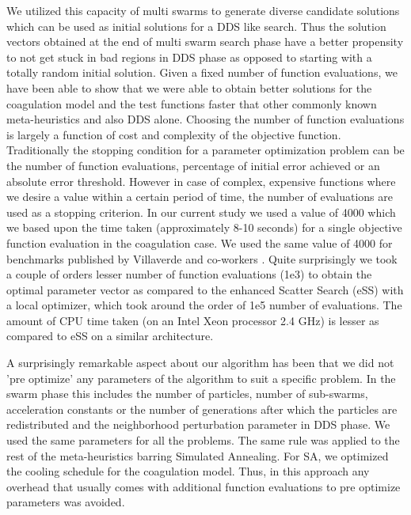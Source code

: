 \documentclass[12pt]{article}
\begin{document}
We utilized this capacity of multi swarms to generate diverse candidate solutions which can be used as initial solutions for a DDS like search. Thus the solution vectors obtained at the end of multi swarm search phase have a better propensity to not get stuck in bad regions in DDS phase as opposed to starting with a totally random initial solution. Given a fixed number of function evaluations, we have been able to show that we were able to obtain better solutions for the coagulation model and the test functions faster that other commonly known meta-heuristics and also DDS alone.  Choosing the number of function evaluations is largely a function of cost and complexity of the objective function. Traditionally the stopping condition for a parameter optimization problem can be the number of function evaluations, percentage of initial error achieved or an absolute error threshold. However in case of complex, expensive functions where we desire a value within a certain period of time, the number of evaluations are used as a stopping criterion. In our current study we used a value of 4000 which we based upon the time taken (approximately 8-10 seconds) for a single objective function evaluation in the coagulation case. We used the same value of 4000 for benchmarks published by Villaverde and co-workers \cite{villaverde2015biopredyn}. Quite surprisingly we took a couple of orders lesser number of function evaluations (1e3) to obtain the optimal parameter vector as compared to the enhanced Scatter Search (eSS) with a local optimizer, which took around the order of 1e5 number of evaluations.  The amount of CPU time taken (on an Intel Xeon processor 2.4 GHz) is lesser as compared to eSS on a similar architecture.

A surprisingly remarkable aspect about our algorithm has been that we did not 'pre optimize' any parameters of the algorithm to suit a specific problem. In the swarm phase this includes the number of particles, number of sub-swarms, acceleration constants or the number of generations after which the particles are redistributed and the neighborhood perturbation parameter in DDS phase. We used the same parameters for all the problems. The same rule was applied to the rest of the meta-heuristics barring Simulated Annealing. For SA, we optimized the cooling schedule for the coagulation model. Thus, in this approach any overhead that usually comes with additional function evaluations to pre optimize parameters was avoided. 
\end{document}
